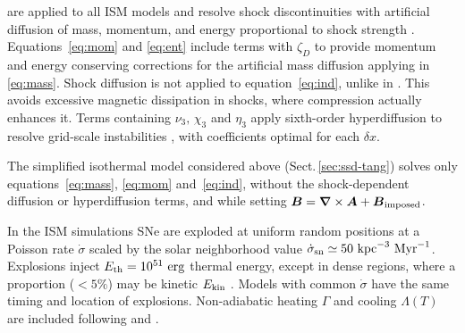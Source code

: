 \documentclass[preprint2]{aastex63}
\newcommand\SNr{\dot\sigma_{\rm sn}}
\newcommand\ESK{E_{\rm kin}}
\newcommand\EST{E_{\rm th}}
\newcommand{\vect}[1]{{{\mbox{\boldmath $#1$}}}}%
\newcommand\kpc{~ {\rm kpc}}
\newcommand\dx{ {\delta x}}
\newcommand\Myr{~ {\rm Myr}}
\newcommand\erg{~ {\rm erg}}
\newcommand{\fg}[1]{\textcolor{midgreen}{#1}}
\newcommand{\mm}[1]{\textcolor{mypurple}{#1}}
\begin{document}
 \fg{are applied to all ISM models and} resolve shock
 discontinuities with artificial diffusion of mass, momentum, and energy
 proportional to shock strength \citep[see][for details]{GMKSH20}.
 \fg{Equations~\eqref{eq:mom} and \eqref{eq:ent} include terms with
   $\zeta_D$} \mm{to} \fg{provide momentum and energy conserving
   corrections for} \mm{the} \fg{artificial mass
 diffusion applying in \eqref{eq:mass}.}
 Shock diffusion is not applied to equation~\eqref{eq:ind}\fg{,
   unlike} \mm{in} \fg{
 \citet{Gent:2013b}.} \mm{This avoids} \fg{excessive magnetic dissipation in
 shocks, where compression actually enhances it.}
 Terms containing $\nu_3,\,\chi_3$ and $\eta_3$ apply sixth-order hyperdiffusion
 to resolve grid-scale instabilities \citep[see, e.g.,][]{ABGS02,HB04}, \fg{
 with coefficients optimal for each $\dx$}.

 \fg{The simplified isothermal model considered above
 (Sect.\,\ref{sec:ssd-tang}) solves only
 equations~\fg{\eqref{eq:mass},} \eqref{eq:mom} and~\eqref{eq:ind},
 without the
 shock-dependent diffusion or hyperdiffusion terms, and while setting
 $\vect{B}=\vect\nabla\times\vect{A}+\vect{B}_{\rm imposed}$.}

 \fg{In the ISM simulations} SNe are exploded at \fg{uniform} random positions
 at a Poisson rate $\dot\sigma$
 \mm{scaled by}
 the solar neighborhood
 value $\SNr\simeq 50\kpc^{-3}\Myr^{-1}$.
 Explosions inject $\EST = 10^{51}\erg$ thermal energy, except in
 dense regions, where a proportion \fg{($<5\%$) may be} kinetic $\ESK$ 
 \citep[see][]{GMKSH20}.
 \fg{Models with common $\dot\sigma$ have the same timing and location of
 explosions.}
 Non-adiabatic heating $\Gamma$ and cooling $\Lambda (T)$ are included
 \citep{Gent:2013a} following \citet{Wolfire:1995} and \citet{Sarazin:1987}.
\end{document}
